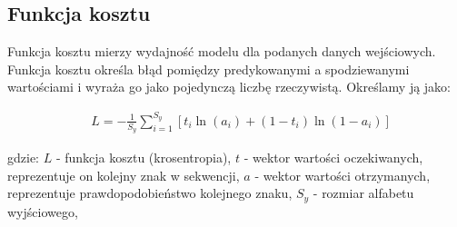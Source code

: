 \subsection{Funkcja kosztu}
Funkcja kosztu mierzy wydajność modelu dla podanych danych wejściowych.
Funkcja kosztu określa błąd pomiędzy predykowanymi a spodziewanymi wartościami i wyraża go jako pojedynczą 
liczbę rzeczywistą. 
Określamy ją jako:

\begin{align*}
  &L = - \frac{1}{S_y}\sum_{i=1}^{S_y}[t_i\ln(a_i) + (1-t_i)\ln(1-a_i)]
\end{align*}

gdzie: \newline
$L$ - funkcja kosztu (krosentropia), \newline
$t$ - wektor wartości oczekiwanych, reprezentuje on kolejny znak w sekwencji, \newline
$a$ - wektor wartości otrzymanych, reprezentuje prawdopodobieństwo kolejnego znaku,  \newline
$S_y$ - rozmiar alfabetu wyjściowego, \newline
